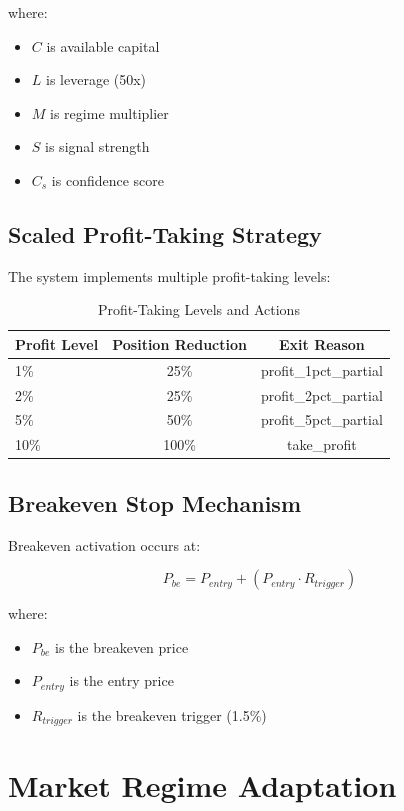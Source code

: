 \documentclass[11pt,a4paper]{article}
\begin{document}
where:
\begin{itemize}
    \item $C$ is available capital
    \item $L$ is leverage (50x)
    \item $M$ is regime multiplier
    \item $S$ is signal strength
    \item $C_s$ is confidence score
\end{itemize}

\subsection{Scaled Profit-Taking Strategy}

The system implements multiple profit-taking levels:

\begin{table}[H]
\centering
\caption{Profit-Taking Levels and Actions}
\label{tab:profit_taking}
\begin{tabular}{@{}lcc@{}}
\toprule
Profit Level & Position Reduction & Exit Reason \\
\midrule
1\% & 25\% & profit\_1pct\_partial \\
2\% & 25\% & profit\_2pct\_partial \\
5\% & 50\% & profit\_5pct\_partial \\
10\% & 100\% & take\_profit \\
\bottomrule
\end{tabular}
\end{table}

\subsection{Breakeven Stop Mechanism}

Breakeven activation occurs at:

\begin{equation}
P_{be} = P_{entry} + (P_{entry} \cdot R_{trigger})
\label{eq:breakeven}
\end{equation}

where:
\begin{itemize}
    \item $P_{be}$ is the breakeven price
    \item $P_{entry}$ is the entry price
    \item $R_{trigger}$ is the breakeven trigger (1.5\%)
\end{itemize}

\section{Market Regime Adaptation}
\end{document}
